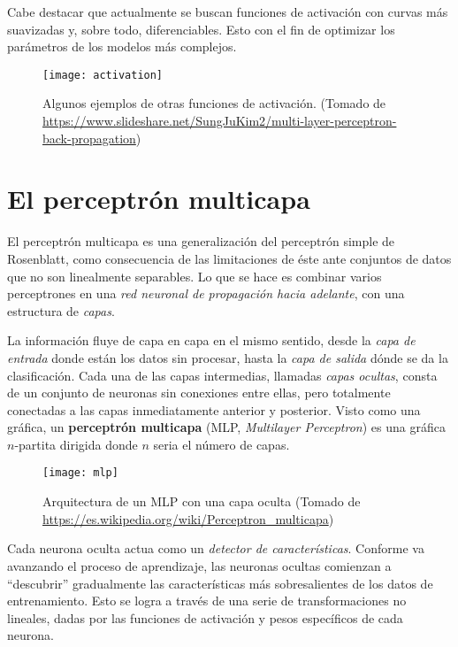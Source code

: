 Cabe destacar que actualmente se buscan funciones de activación con
curvas más suavizadas y, sobre todo, diferenciables. Esto con el fin
de optimizar los parámetros de los modelos más complejos.

\begin{center}
\begin{figure}[H]
  \texttt{[image: activation]} \centering
  \caption{Algunos ejemplos de otras funciones de activación.  (Tomado
    de
    \url{https://www.slideshare.net/SungJuKim2/multi-layer-perceptron-back-propagation})}
\end{figure}
\end{center}

\section{El perceptrón multicapa}
El perceptrón multicapa es una generalización del perceptrón simple de
Rosenblatt, como consecuencia de las limitaciones de éste ante
conjuntos de datos que no son linealmente separables. Lo que se hace
es combinar varios perceptrones en una \textit{red neuronal de
  propagación hacia adelante}, con una estructura de \textit{capas}.

La información fluye de capa en capa en el mismo sentido, desde la
\textit{capa de entrada} donde están los datos sin procesar, hasta la
\textit{capa de salida} dónde se da la clasificación. Cada una de las capas
intermedias, llamadas \textit{capas ocultas}, consta de un conjunto de
neuronas sin conexiones entre ellas, pero totalmente conectadas a las
capas inmediatamente anterior y posterior. Visto como una gráfica, un
\textbf{perceptrón multicapa} (MLP, \textit{Multilayer Perceptron})
es una gráfica $n$-partita dirigida donde $n$ seria el número de
capas.
\begin{figure}[H]
  \texttt{[image: mlp]} \centering \caption{Arquitectura de
  un MLP con una capa oculta (Tomado de \url{https://es.wikipedia.org/wiki/Perceptron_multicapa})}
\end{figure}
Cada neurona oculta actua como un \textit{detector de
  características}. Conforme va avanzando el proceso de aprendizaje,
las neuronas ocultas comienzan a ``descubrir'' gradualmente las
características más sobresalientes de los datos de entrenamiento.
Esto se logra a través de una serie de transformaciones no lineales,
dadas por las funciones de activación y pesos específicos de cada
neurona.

